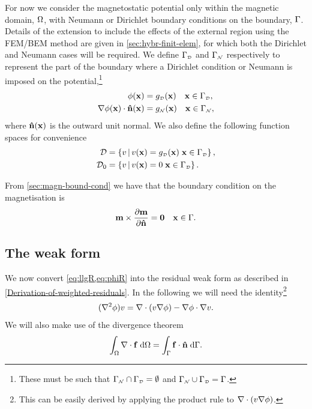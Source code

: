 {For now we consider the magnetostatic potential only within the magnetic domain, $\Omega$, with Neumann or Dirichlet boundary conditions on the boundary, ${\Gamma}$.
Details of the extension to include the effects of the external region using the FEM/BEM method are given in \cref{sec:hybr-finit-elem}, for which both the Dirichlet and Neumann cases will be required.
We define ${\Gamma}_{\scriptscriptstyle{\mathcal{D}}}$ and ${\Gamma}_{\scriptscriptstyle{\mathcal{N}}}$ respectively to represent the part of the boundary where a Dirichlet condition or Neumann is imposed on the potential,\footnote{These must be such that ${\Gamma}_{\scriptscriptstyle{\mathcal{N}}} \cap {\Gamma}_{\scriptscriptstyle{\mathcal{D}}} = \emptyset$ and ${\Gamma}_{\scriptscriptstyle{\mathcal{N}}} \cup {\Gamma}_{\scriptscriptstyle{\mathcal{D}}} = {\Gamma}$.} \ie
\begin{equation}
  \begin{aligned}
    \phi(\boldsymbol{\mathrm{x}}) &= g_{\scriptscriptstyle{\mathcal{D}}}(\boldsymbol{\mathrm{x}}) \quad  \boldsymbol{\mathrm{x}} \in {\Gamma}_{\scriptscriptstyle{\mathcal{D}}}, \\
    \nabla \phi(\boldsymbol{\mathrm{x}}) \cdot \boldsymbol{\mathrm{\hat{n}}}(\boldsymbol{\mathrm{x}}) &= g_{\scriptscriptstyle{\mathcal{N}}}(\boldsymbol{\mathrm{x}}) \quad  \boldsymbol{\mathrm{x}} \in {\Gamma}_{\scriptscriptstyle{\mathcal{N}}},
  \end{aligned}
\end{equation}
where $\boldsymbol{\mathrm{\hat{n}}}(\boldsymbol{\mathrm{x}})$ is the outward unit normal.
We also define the following function spaces for convenience
\begin{equation}
\begin{aligned}
  \label{eq:037}
  \Dfs & = \setst{ v }{ v(\xv) = g_\Dir(\xv) \;  \xv \in \boundd_\Dir }, \\
  \Dfs_0 &= \setst{ v }{ v(\xv) = 0 \;  \xv \in \boundd_\Dir }.
\end{aligned}
\end{equation}

From \cref{sec:magn-bound-cond} we have that the boundary condition on the magnetisation is
\begin{equation}
  \label{eq:m-bc}
  \mv \times \dmdn = \zerov \quad \xv \in \boundd.
\end{equation}


\subsection{The weak form}
\label{sec:weak-form-residuals}

We now convert \cref{eq:llgR,eq:phiR} into the residual weak form as described in \cref{Derivation-of-weighted-residuals}.
In the following we will need the identity\footnote{This can be easily derived by applying the product rule to $\nabla \cdot (v \nabla \phi)$.}
\begin{equation}
  (\lap \phim) \test = \div (v \grad \phim) - \grad \phim \cdot \grad v.
  \label{eq:20}
\end{equation}
We will also make use of the divergence theorem
\begin{equation}
  \intd{\div \fv} = \intb{\fv \cdot \nv}.
  \label{eq:div-thm}
\end{equation}

}
